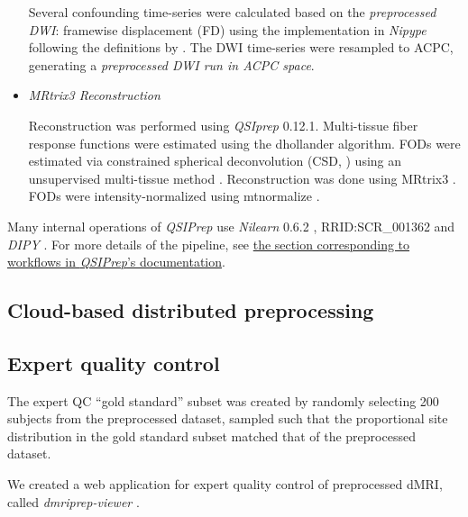 \documentclass[fleqn,10pt]{wlscirep}
\begin{document}
\begin{itemize}
Several confounding time-series were calculated based on the
\emph{preprocessed DWI}: framewise displacement (FD) using the implementation
in \emph{Nipype} following the definitions by \cite{power_fd_dvars}. The DWI
time-series were resampled to ACPC, generating a \emph{preprocessed DWI run
in ACPC space}.

\item {\it MRtrix3 Reconstruction}

Reconstruction was performed using \emph{QSIprep} 0.12.1. Multi-tissue fiber response functions were estimated using the dhollander algorithm. FODs were estimated via constrained spherical deconvolution (CSD, \cite{originalcsd, tournier2008csd}) using an unsupervised multi-tissue method \cite{dhollander2019response, dhollander2016unsupervised}. Reconstruction was done using MRtrix3 \cite{mrtrix3}. FODs were intensity-normalized using mtnormalize \cite{mtnormalize}.

\end{itemize}

Many internal operations of \emph{QSIPrep} use \emph{Nilearn} 0.6.2 \cite{nilearn}, RRID:SCR\_001362 and \emph{DIPY} \cite{dipy}. For more details of the pipeline, see \href{https://qsiprep.readthedocs.io/en/latest/workflows.html}{the section corresponding to workflows in \emph{QSIPrep}'s documentation}.

\subsection*{Cloud-based distributed preprocessing}


\subsection*{Expert quality control}

The expert QC ``gold standard'' subset was created by randomly selecting 200 subjects from the preprocessed dataset, sampled such that the proportional site distribution in the gold standard subset matched that of the preprocessed dataset.

We created a web application for expert quality control of preprocessed dMRI, called \emph{dmriprep-viewer} \cite{richie-halford2021-viewer}.

\end{document}
